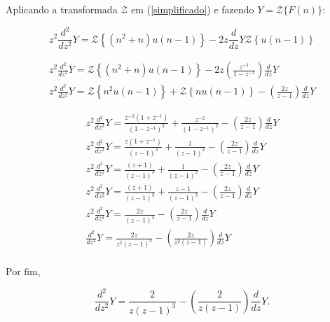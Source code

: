 \documentclass[a4paper,10pt]{article}
\begin{document}
Aplicando a transformada  $\mathcal{Z}$ em (\ref{simplificado}) e fazendo $ Y = \mathcal{Z} \{ F(n) \} $:

$$
 z^2 \displaystyle \frac{d^2}{dz^2}Y = \mathcal{Z} \left\{(n^2 + n) u(n - 1) \right\} - 2 z  
 \displaystyle \frac{d}{dz}Y \mathcal{Z} \left\{u(n-1)\right\}
$$

$$
\begin{array}{lcl} 
 z^2 \displaystyle \frac{d^2}{dz^2}Y = \mathcal{Z} \left\{(n^2 + n) u(n - 1) \right\} - 2 z   
 \left( \displaystyle \frac{z^{-1}}{1 - z^{-1}} \right) \displaystyle \frac{d}{dz}Y \\
 z^2 \displaystyle \frac{d^2}{dz^2}Y = \mathcal{Z} \left\{ n^2 u(n-1) \right\} + 
 \mathcal{Z} \left\{ n u(n - 1) \right\} -  \left( \displaystyle \frac{2z}{z - 1} \right) \displaystyle \frac{d}{dz}Y
\end{array}  
$$

$$
\begin{array}{lcl} 
z^2 \displaystyle \frac{d^2}{dz^2}Y = \frac{z^{-2} (1 + z^{-1})}{(1 - z^{-1})^3} + 
 \frac{z^{-2}}{(1 - z^{-1})^2} -  \left( \displaystyle \frac{2z}{z - 1} \right) \displaystyle \frac{d}{dz}Y \\
 z^2 \displaystyle \frac{d^2}{dz^2}Y = \frac{z (1 + z^{-1})}{(z - 1)^3} + 
 \frac{1}{(z - 1)^2} -  \left( \displaystyle \frac{2z}{z - 1} \right) \displaystyle \frac{d}{dz}Y \\
 z^2 \displaystyle \frac{d^2}{dz^2}Y = \frac{(z + 1)}{(z - 1)^3} + 
 \frac{1}{(z - 1)^2} -  \left( \displaystyle \frac{2z}{z - 1} \right) \displaystyle \frac{d}{dz}Y \\
 z^2 \displaystyle \frac{d^2}{dz^2}Y = \frac{(z + 1)}{(z - 1)^3} + 
 \frac{z - 1}{(z - 1)^3} -  \left( \displaystyle \frac{2z}{z - 1} \right) \displaystyle \frac{d}{dz}Y \\
 z^2 \displaystyle \frac{d^2}{dz^2}Y = \frac{2z}{(z - 1)^3} -  \left( \displaystyle \frac{2z}{z - 1} \right) \displaystyle \frac{d}{dz}Y \\
 \displaystyle \frac{d^2}{dz^2}Y = \frac{2z}{z^2(z - 1)^3} -  \left( \displaystyle \frac{2z}{z^2(z - 1)} \right) \displaystyle \frac{d}{dz}Y \\
\end{array}  
$$

Por fim,

\begin{equation}
 \displaystyle \frac{d^2}{dz^2}Y = \frac{2}{z(z - 1)^3} -  \left( \displaystyle \frac{2}{z(z - 1)} \right) \displaystyle \frac{d}{dz}Y.
 \label{equacao.diferencial}
\end{equation}
\end{document}
